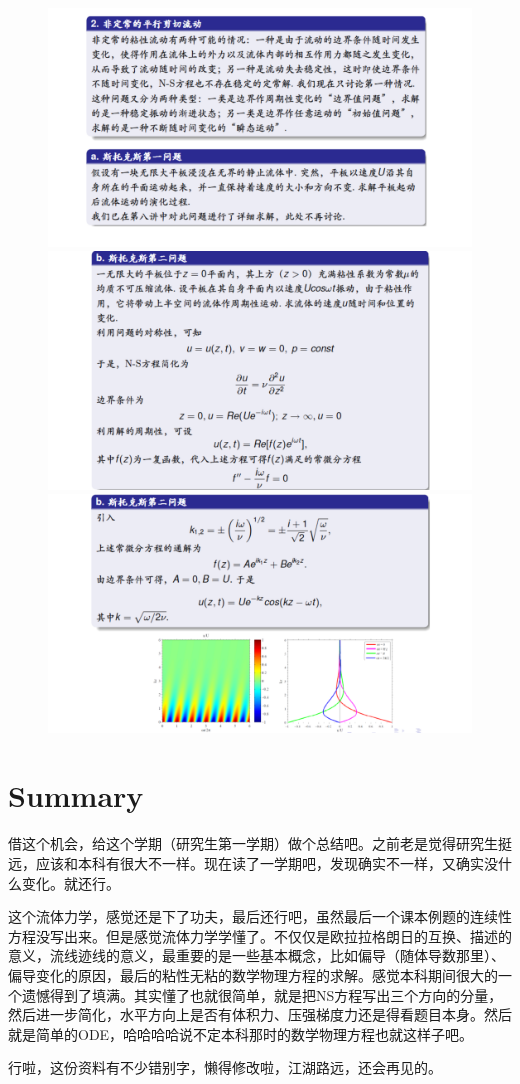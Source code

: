\documentclass[UTF8,12pt]{article}
\begin{document}
\begin{figure}[h]
    \centering
    \includegraphics[width=.8\linewidth]{img/cal-2018_06_Page7.png}
    \includegraphics[width=.8\linewidth]{img/cal-2018_06_Page8.png}
    \includegraphics[width=.8\linewidth]{img/cal-2018_06_Page9.png}
\end{figure}

\section{Summary}

借这个机会，给这个学期（研究生第一学期）做个总结吧。之前老是觉得研究生挺远，应该和本科有很大不一样。现在读了一学期吧，发现确实不一样，又确实没什么变化。就还行。

这个流体力学，感觉还是下了功夫，最后还行吧，虽然最后一个课本例题的连续性方程没写出来。但是感觉流体力学学懂了。不仅仅是欧拉拉格朗日的互换、描述的意义，流线迹线的意义，最重要的是一些基本概念，比如偏导（随体导数那里）、偏导变化的原因，最后的粘性无粘的数学物理方程的求解。感觉本科期间很大的一个遗憾得到了填满。其实懂了也就很简单，就是把NS方程写出三个方向的分量，然后进一步简化，水平方向上是否有体积力、压强梯度力还是得看题目本身。然后就是简单的ODE，哈哈哈哈说不定本科那时的数学物理方程也就这样子吧。

行啦，这份资料有不少错别字，懒得修改啦，江湖路远，还会再见的。
\end{document}

